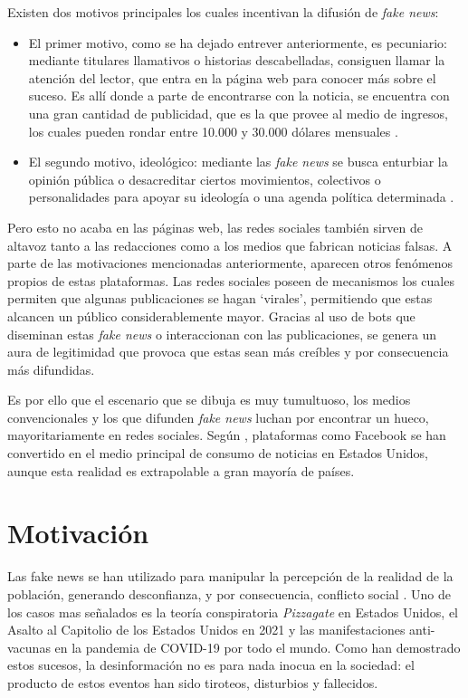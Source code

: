 Existen dos motivos principales los cuales incentivan la difusión de \emph{fake news}:
\begin{itemize}
    \item El primer motivo, como se ha dejado entrever anteriormente, es pecuniario: mediante titulares llamativos o historias descabelladas, consiguen llamar la atención del lector, que entra en la página web para conocer más sobre el suceso. Es allí donde a parte de encontrarse con la noticia, se encuentra con una gran cantidad de publicidad, que es la que provee al medio de ingresos, los cuales pueden rondar entre 10.000 y 30.000 dólares mensuales \citep{Sydell2016}.
    \item El segundo motivo, ideológico: mediante las \emph{fake news} se busca enturbiar la opinión pública o desacreditar ciertos movimientos, colectivos o personalidades para apoyar su ideología o una agenda política determinada \citep{AlcottGentzkow2017,Sydell2016}.
\end{itemize}

Pero esto no acaba en las páginas web, las redes sociales también sirven de altavoz tanto a las redacciones como a los medios que fabrican noticias falsas. A parte de las motivaciones mencionadas anteriormente, aparecen otros fenómenos propios de estas plataformas. Las redes sociales poseen de mecanismos los cuales permiten que algunas publicaciones se hagan `virales', permitiendo que estas alcancen un público considerablemente mayor. Gracias al uso de bots que diseminan estas \emph{fake news} o interaccionan con las publicaciones, se genera un aura de legitimidad que provoca que estas sean más creíbles y por consecuencia más difundidas. 

Es por ello que el escenario que se dibuja es muy tumultuoso, los medios convencionales y los que difunden \emph{fake news} luchan por encontrar un hueco, mayoritariamente en redes sociales. Según \citet{Reid2017,Gottfried2016}, plataformas como Facebook se han convertido en el medio principal de consumo de noticias en Estados Unidos, aunque esta realidad es extrapolable a gran mayoría de países. 


\section{Motivación}

Las fake news se han utilizado para manipular la percepción de la realidad de la población, generando desconfianza, y por consecuencia, conflicto social \citep{CITSa}. Uno de los casos mas señalados es la teoría conspiratoria \emph{Pizzagate} en Estados Unidos, el Asalto al Capitolio de los Estados Unidos en 2021 y las manifestaciones anti-vacunas en la pandemia de COVID-19 por todo el mundo. Como han demostrado estos sucesos, la desinformación no es para nada inocua en la sociedad: el producto de estos eventos han sido tiroteos, disturbios y fallecidos.

